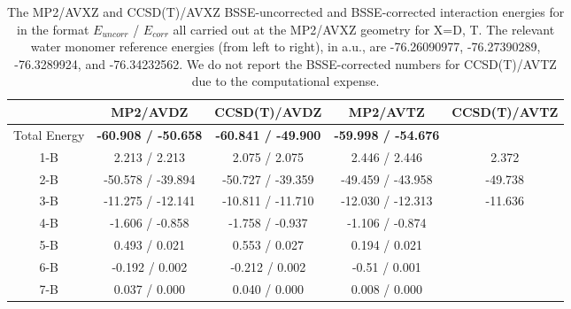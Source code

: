 \begin{table}[t]
\begin{adjustbox}{width=\columnwidth,center}
\begin{tabular}{@{}ccccc@{}}
\toprule
             & MP2/AVDZ          & CCSD(T)/AVDZ               & MP2/AVTZ          & CCSD(T)/AVTZ \\
             \hline
Total Energy & \textbf{-60.908 / -50.658} & \textbf{-60.841 / -49.900} & \textbf{-59.998 / -54.676} &              \\
\hline
1-B          & 2.213 / 2.213     & 2.075 / 2.075              & 2.446 / 2.446     & 2.372        \\
2-B          & -50.578 / -39.894 & -50.727 / -39.359          & -49.459 / -43.958 & -49.738      \\
3-B          & -11.275 / -12.141 & -10.811 / -11.710          & -12.030 / -12.313 & -11.636      \\
4-B          & -1.606 / -0.858   & -1.758 / -0.937            & -1.106 / -0.874   &              \\
5-B          & 0.493 / 0.021     & 0.553 / 0.027              & 0.194 / 0.021     &              \\
6-B          & -0.192 / 0.002    & -0.212 / 0.002             & -0.51 / 0.001     &              \\
7-B          & 0.037 / 0.000     & 0.040 / 0.000              & 0.008 / 0.000     &             \\ \bottomrule
\end{tabular}
\end{adjustbox}
\begin{spacing}{1.0}
\caption[The MP2/AVXZ and CCSD(T)/AVXZ BSSE-uncorrected and BSSE-corrected interaction energies for  in the format $E_{uncorr}$ / $E_{corr}$ all carried out at the MP2/AVXZ geometry for X=D, T. The relevant water monomer reference energies (from left to right), in a.u., are -76.26090977, -76.27390289, -76.3289924, and -76.34232562. We do not report the BSSE-corrected numbers for CCSD(T)/AVTZ due to the computational expense.]{The MP2/AVXZ and CCSD(T)/AVXZ BSSE-uncorrected and BSSE-corrected interaction energies for  in the format $E_{uncorr}$ / $E_{corr}$ all carried out at the MP2/AVXZ geometry for X=D, T. The relevant water monomer reference energies (from left to right), in a.u., are -76.26090977, -76.27390289, -76.3289924, and -76.34232562. We do not report the BSSE-corrected numbers for CCSD(T)/AVTZ due to the computational expense.}\label{tab:MBE_I_T5}
\end{spacing}
\end{table}